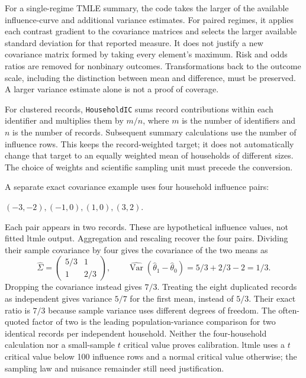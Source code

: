 For a single-regime TMLE summary, the code takes the larger of the available
influence-curve and additional variance estimates. For paired regimes, it
applies each contrast gradient to the covariance matrices and selects the
larger available standard deviation for that reported measure. It does not
justify a new covariance matrix formed by taking every element's maximum.
Risk and odds ratios are removed for nonbinary outcomes. Transformations back
to the outcome scale, including the distinction between mean and difference,
must be preserved. A larger variance estimate alone is not a proof of
coverage.~\citep{exec23_ltmle_source}

For clustered records, \texttt{HouseholdIC} sums record contributions within
each identifier and multiplies them by $m/n$, where $m$ is the number of
identifiers and $n$ is the number of records. Subsequent summary calculations
use the number of influence rows. This keeps the record-weighted target;
it does not automatically change that target to an equally weighted mean
of households of different sizes. The choice of weights and scientific
sampling unit must precede the conversion.

A separate exact covariance example uses four household influence pairs:
\begin{center}
$(-3,-2),(-1,0),(1,0),(3,2)$.
\end{center}
Each pair appears in two records. These are
hypothetical influence values, not fitted ltmle output. Aggregation and
rescaling recover the four pairs. Dividing their sample covariance by four
gives the covariance of the two means as
\begin{equation}
 \widehat\Sigma=\begin{pmatrix}5/3&1\\1&2/3\end{pmatrix},\qquad
 \widehat{\operatorname{Var}}(\widehat\theta_1-\widehat\theta_0)
 =5/3+2/3-2=1/3.
 \label{exec23:ltmle-cluster}
\end{equation}
Dropping the covariance instead gives $7/3$. Treating the eight duplicated
records as independent gives variance $5/7$ for the first mean, instead of
$5/3$. Their exact ratio is $7/3$ because sample variance uses different
degrees of freedom. The often-quoted factor of two is the leading
population-variance comparison for two identical records per independent
household. Neither the four-household calculation nor a small-sample
$t$ critical value proves calibration. ltmle uses a $t$ critical value below
100 influence rows and a normal critical value otherwise; the sampling law
and nuisance remainder still need justification.
\citep{exec23_ltmle_source,exec23_ltmle_exact}

